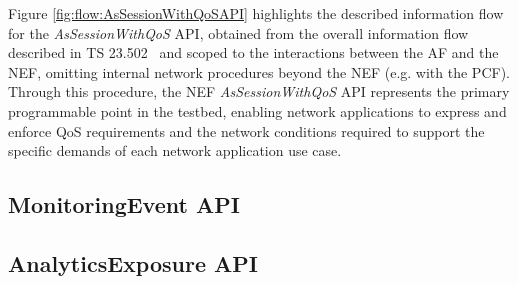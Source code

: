 Figure \ref{fig:flow:AsSessionWithQoSAPI} highlights the described information flow for the \textit{AsSessionWithQoS} \acs{API}, obtained from the overall information flow described in TS 23.502~\cite{3GPP-23.502} and scoped to the interactions between the \acs{AF} and the \acs{NEF}, omitting internal network procedures beyond the \acs{NEF} (e.g. with the \acs{PCF}). Through this procedure, the \acs{NEF} \textit{AsSessionWithQoS} \acs{API} represents the primary programmable point in the testbed, enabling network applications to express and enforce \acs{QoS} requirements and the network conditions required to support the specific demands of each network application use case.

\subsection{MonitoringEvent \acs{API}}
\label{chap:proposal:nef:MonitoringEvent}


\subsection{AnalyticsExposure \acs{API}}
\label{chap:proposal:nef:AnalyticsExposure}

